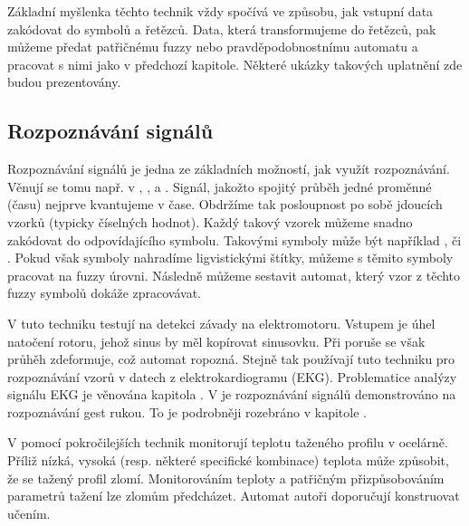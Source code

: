 \documentclass[a4paper,10pt]{article}
\begin{document}
Základní myšlenka těchto technik vždy spočívá ve způsobu, jak vstupní data zakódovat do symbolů a řetězců. Data, která transformujeme do řetězců, pak můžeme předat patřičnému fuzzy nebo pravděpodobnostnímu automatu a pracovat s nimi jako v předchozí kapitole. Některé ukázky takových uplatnění zde budou prezentovány. 

\subsection{Rozpoznávání signálů} \label{subs:RozpSign}
Rozpoznávání signálů je jedna ze základních možností, jak využít rozpoznávání. Věnují se tomu např. v \cite{MukRay-StaSplMerProbFiStaAuSigRepAna}, \cite{Rig-FauDetIsoBasFuzzAut}, \cite{BaiTri-PattRecUsiTemFuzzAut} a \cite{KemAda-SeqPatRecEmpRecFuzSys}. Signál, jakožto spojitý průběh jedné proměnné (času) nejprve kvantujeme v čase. Obdržíme tak posloupnost po sobě jdoucích vzorků (typicky číselných hodnot). Každý takový vzorek můžeme snadno zakódovat do odpovídajícího symbolu. Takovými symboly může být například ,  či . Pokud však symboly nahradíme ligvistickými štítky, můžeme s těmito symboly pracovat na fuzzy úrovni. Následně můžeme sestavit automat, který vzor z těchto fuzzy symbolů dokáže zpracovávat.



V \cite{Rig-FauDetIsoBasFuzzAut} tuto techniku testují na detekci závady na elektromotoru. Vstupem je úhel natočení rotoru, jehož sinus by měl kopírovat sinusovku. Při poruše se však průhěh zdeformuje, což automat ropozná. Stejně tak používají tuto techniku pro rozpoznávání vzorů v datech z elektrokardiogramu (EKG). Problematice analýzy signálu EKG je věnována kapitola . V \cite{BaiTri-PattRecUsiTemFuzzAut} je rozpoznávání signálů demonstrováno na rozpoznávání gest rukou. To je podrobněji rozebráno v kapitole .

V \cite{KemAda-SeqPatRecEmpRecFuzSys} pomocí pokročilejších technik monitorují teplotu taženého profilu v ocelárně. Příliž nízká, vysoká (resp. některé specifické kombinace) teplota může způsobit, že se tažený profil zlomí. Monitorováním teploty a patřičným přizpůsobováním parametrů tažení lze zlomům předcházet. Automat autoři doporučují konstruovat učením.
\end{document}

